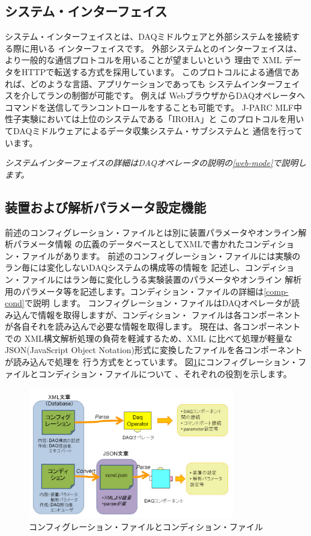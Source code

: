 \documentclass[a4j,10pt,dvips,onecolumn,oneside,final]{jarticle}%
\begin{document}
\subsection{システム・インターフェイス}\label{sysint}
システム・インターフェイスとは、DAQミドルウェアと外部システムを接続する際に用いる
インターフェイスです。
外部システムとのインターフェイスは、より一般的な通信プロトコルを用いることが望ましいという
理由で XML データをHTTPで転送する方式を採用しています。
このプロトコルによる通信であれば、どのような言語、アプリケーションであっても
システムインターフェイスを介してランの制御が可能です。
例えば WebブラウザからDAQオペレータへコマンドを送信してランコントロールをすることも可能です。
J-PARC MLF中性子実験においては上位のシステムである「IROHA」と
このプロトコルを用いてDAQミドルウェアによるデータ収集システム・サブシステムと
通信を行っています。

{\it
システムインターフェイスの詳細はDAQオペレータの説明の\ref{web-mode}で説明します。
}

\subsection{装置および解析パラメータ設定機能}\label{cond}
前述のコンフィグレーション・ファイルとは別に装置パラメータやオンライン解析パラメータ情報
の広義のデータベースとしてXMLで書かれたコンディション・ファイルがあります。
前述のコンフィグレーション・ファイルには実験のラン毎には変化しないDAQシステムの構成等の情報を
記述し、コンディション・ファイルにはラン毎に変化しうる実験装置のパラメータやオンライン
解析用のパラメータ等を記述します。コンディション・ファイルの詳細は\ref{comp-cond}で説明
します。
コンフィグレーション・ファイルはDAQオペレータが読み込んで情報を取得しますが、コンディション・
ファイルは各コンポーネントが各自それを読み込んで必要な情報を取得します。
現在は、各コンポーネントでの XML構文解析処理の負荷を軽減するため、XML に比べて処理が軽量な 
JSON(JavaScript Object Notation)形式に変換したファイルを各コンポーネントが読み込んで処理を
行う方式をとっています。
図\ref{condition.fig}にコンフィグレーション・ファイルとコンディション・ファイルについて
、それぞれの役割を示します。
\begin{figure}[htbp]
 \begin{center}
  \includegraphics[width=90mm]{condition.pdf}
  \caption{コンフィグレーション・ファイルとコンディション・ファイル}
  \label{condition.fig}
 \end{center}
\end{figure}
\end{document}

